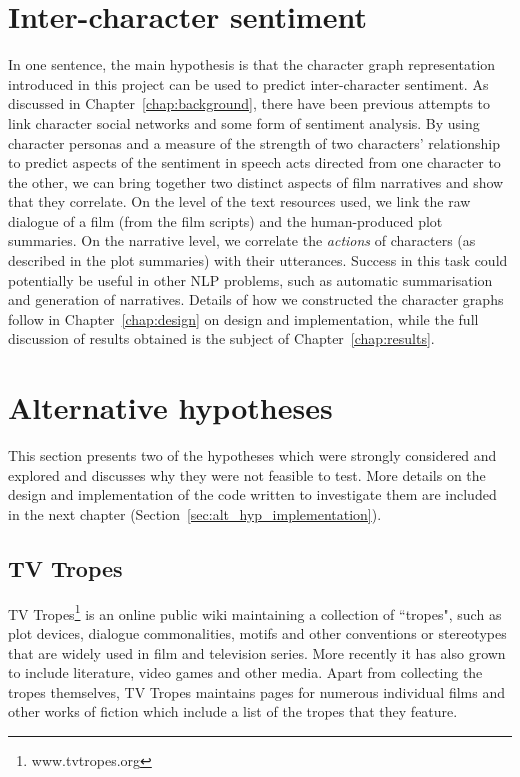 \documentclass[bsc,frontabs,deptreport,singlespacing,parskip, twoside]{infthesis}
\begin{document}
\section{Inter-character sentiment}
In one sentence, the main hypothesis is that the character graph representation introduced in this project can be used to predict inter-character sentiment. As discussed in Chapter~\ref{chap:background}, there have been previous attempts to link character social networks and some form of sentiment analysis. By using character personas and a measure of the strength of two characters' relationship to predict aspects of the sentiment in speech acts directed from one character to the other, we can bring together two distinct aspects of film narratives and show that they correlate. On the level of the text resources used, we link the raw dialogue of a film (from the film scripts) and the human-produced plot summaries. On the narrative level, we correlate the \textit{actions} of characters (as described in the plot summaries) with their utterances. Success in this task could potentially be useful in other NLP problems, such as automatic summarisation and generation of narratives. Details of how we constructed the character graphs follow in Chapter~\ref{chap:design} on design and implementation, while the full discussion of results obtained is the subject of Chapter~\ref{chap:results}.

\section{Alternative hypotheses}

This section presents two of the hypotheses which were strongly considered and explored and discusses why they were not feasible to test. More details on the design and implementation of the code written to investigate them are included in the next chapter (Section~\ref{sec:alt_hyp_implementation}).

\subsection{TV Tropes}
\label{sec:alt_tropes}
TV Tropes\footnote{www.tvtropes.org} is an online public wiki maintaining a collection of ``tropes", such as plot devices, dialogue commonalities, motifs and other conventions or stereotypes that are widely used in film and television series. More recently it has also grown to include literature, video games and other media. Apart from collecting the tropes themselves, TV Tropes maintains pages for numerous individual films and other works of fiction which include a list of the tropes that they feature.
\end{document}
